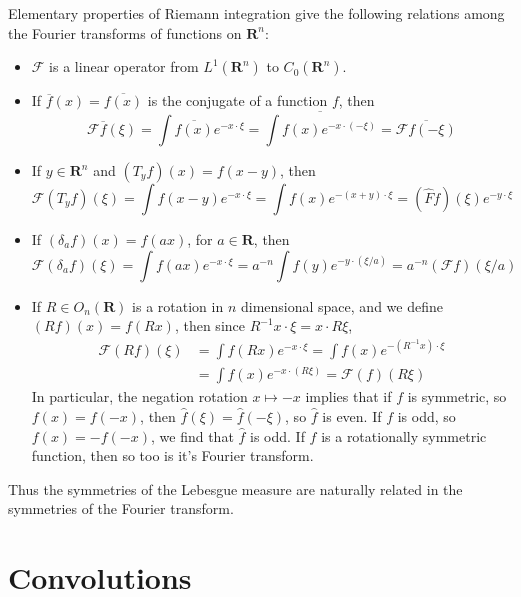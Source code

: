 Elementary properties of Riemann integration give the following relations among the Fourier transforms of functions on $\mathbf{R}^n$:
%
\begin{itemize}
	\item $\mathcal{F}$ is a linear operator from $L^1(\mathbf{R}^n)$ to $C_0(\mathbf{R}^n)$.
	
	\item If $\overline{f}(x) = \overline{f(x)}$ is the conjugate of a function $f$, then
	\[ \mathcal{F} \overline{f}(\xi) = \int \overline{f(x)} e^{- x \cdot \xi} = \overline{\int f(x) e^{-x \cdot (-\xi)}} = \overline{\mathcal{F} f(-\xi)} \]
	
	\item If $y \in \mathbf{R}^n$ and $(T_y f)(x) = f(x-y)$, then
	\[ \mathcal{F}(T_y f)(\xi) = \int f(x-y) e^{- x \cdot \xi} = \int f(x) e^{-(x + y) \cdot \xi} = (\widehat{F} f)(\xi) e^{-y \cdot \xi} \]


	\item If $(\delta_a f)(x) = f(ax)$, for $a \in \mathbf{R}$, then
	\[ \mathcal{F}(\delta_a f)(\xi) = \int f(ax) e^{-x \cdot \xi} = a^{-n} \int f(y) e^{-y \cdot (\xi/a)} = a^{-n} (\mathcal{F} f)(\xi/a) \]

	\item If $R \in O_n(\mathbf{R})$ is a rotation in $n$ dimensional space, and we define $(Rf)(x) = f(Rx)$, then since $R^{-1}x \cdot \xi = x \cdot R\xi$,
	\begin{align*}
		\mathcal{F}(Rf)(\xi) &= \int f(Rx) e^{-x \cdot \xi} = \int f(x) e^{-(R^{-1}x) \cdot \xi}\\
		&= \int f(x) e^{-x \cdot (R\xi)} = \mathcal{F}(f)(R\xi)
	\end{align*}
	In particular, the negation rotation $x \mapsto -x$ implies that if $f$ is symmetric, so $f(x) = f(-x)$, then $\widehat{f}(\xi) = \widehat{f}(-\xi)$, so $\widehat{f}$ is even. If $f$ is odd, so $f(x) = -f(-x)$, we find that $\widehat{f}$ is odd. If $f$ is a rotationally symmetric function, then so too is it's Fourier transform.
\end{itemize}
%
Thus the symmetries of the Lebesgue measure are naturally related in the symmetries of the Fourier transform.

\section{Convolutions}

